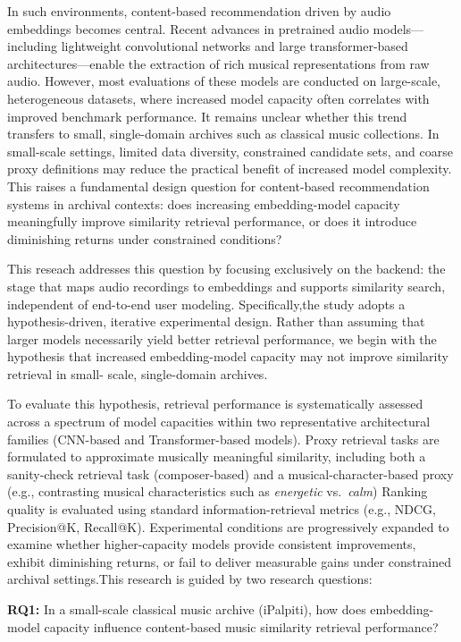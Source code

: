 \documentclass{article}
\begin{document}
In such environments, content-based recommendation driven by audio embeddings becomes central.
Recent advances in pretrained audio models---including lightweight convolutional networks and large
transformer-based architectures---enable the extraction of rich musical representations from raw
audio.
However, most evaluations of these models are conducted on large-scale, heterogeneous datasets, where
increased model capacity often correlates with improved benchmark performance.
It remains unclear whether this trend transfers to small, single-domain archives such as classical
music collections.
In small-scale settings, limited data diversity, constrained candidate sets, and coarse proxy
definitions may reduce the practical benefit of increased model complexity.
This raises a fundamental design question for content-based recommendation systems in archival
contexts: does increasing embedding-model capacity meaningfully improve similarity retrieval
performance, or does it introduce diminishing returns under constrained conditions?

This reseach addresses this question by focusing exclusively on the backend: the stage that maps audio
recordings to embeddings and supports similarity search, independent of end-to-end user modeling.
Specifically,the study adopts a hypothesis-driven, iterative experimental design.
Rather than assuming that larger models necessarily yield better retrieval performance, we begin with
the hypothesis that increased embedding-model capacity may not improve similarity retrieval in small-
scale, single-domain archives.

To evaluate this hypothesis, retrieval performance is systematically assessed across a spectrum of
model capacities within two representative architectural families (CNN-based and Transformer-based
models).
Proxy retrieval tasks are formulated to approximate musically meaningful similarity, including both a
sanity-check retrieval task (composer-based) and a musical-character-based proxy (e.g., contrasting musical characteristics such as \emph{energetic} vs.\ \emph{calm})
Ranking quality is evaluated using standard information-retrieval metrics (e.g., NDCG, Precision@K, Recall@K).
Experimental conditions are progressively expanded to examine whether higher-capacity models provide
consistent improvements, exhibit diminishing returns, or fail to deliver measurable gains under
constrained archival settings.This research is guided by two research questions:

\smallskip
\noindent\textbf{RQ1:} In a small-scale classical music archive (iPalpiti), how does embedding-model
capacity influence content-based music similarity retrieval performance?
\end{document}
